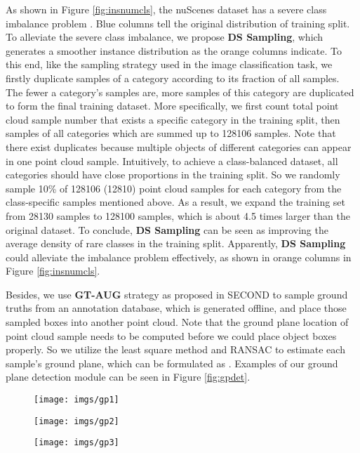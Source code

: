 \documentclass[10pt,twocolumn,letterpaper]{article}
\begin{document}
As shown in Figure \ref{fig:insnumcls}, the nuScenes dataset \cite{nuscenes} has a severe class imbalance problem . Blue columns tell the original distribution of training split. To alleviate the severe class imbalance, we propose \textbf{DS Sampling}, which generates a smoother instance distribution as the orange columns indicate. To this end, like the sampling strategy used in the image classification task, we firstly duplicate samples of a category according to its fraction of all samples. The fewer a category's samples are, more samples of this category are duplicated to form the final training dataset.  More specifically, we first count total point cloud sample number that exists a specific category in the training split, then samples of all categories which are summed up to 128106 samples. Note that there exist duplicates because multiple objects of different categories can appear in one point cloud sample. Intuitively, to achieve a class-balanced dataset, all categories should have close proportions in the training split. So we randomly sample 10\% of 128106 (12810) point cloud samples for each category from the class-specific samples mentioned above. As a result, we expand the training set from 28130 samples to 128100 samples, which is about 4.5 times larger than the original dataset. To conclude, \textbf{DS Sampling} can be seen as improving the average density of rare classes in the training split. Apparently, \textbf{DS Sampling} could alleviate the imbalance problem effectively, as shown in orange columns in Figure \ref{fig:insnumcls}.

Besides, we use \textbf{GT-AUG} strategy as proposed in SECOND \cite{Yan_2018} to sample ground truths from an annotation database, which is generated offline, and place those sampled boxes into another point cloud. Note that the ground plane location of point cloud sample needs to be computed before we could place object boxes properly. So we utilize the least square method and RANSAC \cite{Fischler1987Random} to estimate each sample's ground plane, which can be formulated as . Examples of our ground plane detection module can be seen in Figure \ref{fig:gpdet}.

\begin{figure*}
\centering
\begin{subfigure}{.33\textwidth}
  \centering
  \texttt{[image: imgs/gp1]}
\label{fig:sub1}
\end{subfigure}\begin{subfigure}{.33\textwidth}
  \centering
  \texttt{[image: imgs/gp2]}
\label{fig:sub2}
\end{subfigure}
\begin{subfigure}{.33\textwidth}
  \centering
  \texttt{[image: imgs/gp3]}
\label{fig:sub3}
\end{subfigure}
\caption{\textbf{Examples of ground plane detection result.} Points belonging to ground plane are shown in color, which can be formulated by . In average, the ground plane is about -1.82 meters along z axis. Open3D \cite{DBLP:journals/corr/abs-1801-09847} is used for visualization.}
\label{fig:gpdet}
\end{figure*}
 
\end{document}
